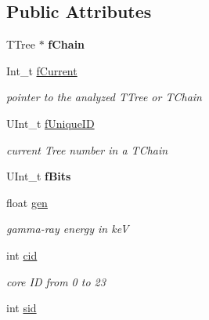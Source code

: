 \subsection*{Public Attributes}
\begin{DoxyCompactItemize}
\item 
\hypertarget{classg__clx_aa0c1129a726bb6a3bda4197decf634f2}{T\-Tree $\ast$ {\bfseries f\-Chain}}\label{classg__clx_aa0c1129a726bb6a3bda4197decf634f2}

\item 
\hypertarget{classg__clx_a4ebe765901e5abf5d740a59edd2796d3}{Int\-\_\-t \hyperlink{classg__clx_a4ebe765901e5abf5d740a59edd2796d3}{f\-Current}}\label{classg__clx_a4ebe765901e5abf5d740a59edd2796d3}

\begin{DoxyCompactList}\small\item\em pointer to the analyzed T\-Tree or T\-Chain \end{DoxyCompactList}\item 
\hypertarget{classg__clx_abf3f260c2d2f9884a9f6b041f54ec94a}{U\-Int\-\_\-t \hyperlink{classg__clx_abf3f260c2d2f9884a9f6b041f54ec94a}{f\-Unique\-I\-D}}\label{classg__clx_abf3f260c2d2f9884a9f6b041f54ec94a}

\begin{DoxyCompactList}\small\item\em current Tree number in a T\-Chain \end{DoxyCompactList}\item 
\hypertarget{classg__clx_a7206bd09efca58552eea94544746280e}{U\-Int\-\_\-t {\bfseries f\-Bits}}\label{classg__clx_a7206bd09efca58552eea94544746280e}

\item 
\hypertarget{classg__clx_afa1d8a83322f5f91c433b1747ffdc71b}{float \hyperlink{classg__clx_afa1d8a83322f5f91c433b1747ffdc71b}{gen}}\label{classg__clx_afa1d8a83322f5f91c433b1747ffdc71b}

\begin{DoxyCompactList}\small\item\em gamma-\/ray energy in ke\-V \end{DoxyCompactList}\item 
\hypertarget{classg__clx_a0cc2a584a4f5152751778ee68bcdb743}{int \hyperlink{classg__clx_a0cc2a584a4f5152751778ee68bcdb743}{cid}}\label{classg__clx_a0cc2a584a4f5152751778ee68bcdb743}

\begin{DoxyCompactList}\small\item\em core I\-D from 0 to 23 \end{DoxyCompactList}\item 
\hypertarget{classg__clx_a04f33012ec56804fca6978885732bc8f}{int \hyperlink{classg__clx_a04f33012ec56804fca6978885732bc8f}{sid}}\label{classg__clx_a04f33012ec56804fca6978885732bc8f}


\end{DoxyCompactItemize}
